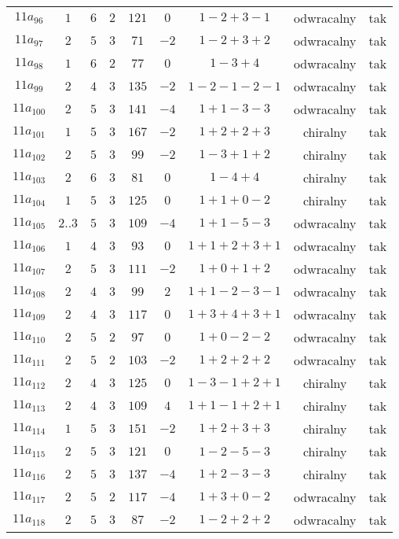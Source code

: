 \begin{longtable}{ccccccccc}
$11a_{96}$ & $1$ & $6$ & $2$ & $121$ & $0$ & $1-2+3-1$ & odwracalny & tak \\
$11a_{97}$ & $2$ & $5$ & $3$ & $71$ & $-2$ & $1-2+3+2$ & odwracalny & tak \\
$11a_{98}$ & $1$ & $6$ & $2$ & $77$ & $0$ & $1-3+4$ & odwracalny & tak \\
$11a_{99}$ & $2$ & $4$ & $3$ & $135$ & $-2$ & $1-2-1-2-1$ & odwracalny & tak \\
$11a_{100}$ & $2$ & $5$ & $3$ & $141$ & $-4$ & $1+1-3-3$ & odwracalny & tak \\
$11a_{101}$ & $1$ & $5$ & $3$ & $167$ & $-2$ & $1+2+2+3$ & chiralny & tak \\
$11a_{102}$ & $2$ & $5$ & $3$ & $99$ & $-2$ & $1-3+1+2$ & chiralny & tak \\
$11a_{103}$ & $2$ & $6$ & $3$ & $81$ & $0$ & $1-4+4$ & chiralny & tak \\
$11a_{104}$ & $1$ & $5$ & $3$ & $125$ & $0$ & $1+1+0-2$ & chiralny & tak \\
$11a_{105}$ & $2..3$ & $5$ & $3$ & $109$ & $-4$ & $1+1-5-3$ & odwracalny & tak \\
$11a_{106}$ & $1$ & $4$ & $3$ & $93$ & $0$ & $1+1+2+3+1$ & odwracalny & tak \\
$11a_{107}$ & $2$ & $5$ & $3$ & $111$ & $-2$ & $1+0+1+2$ & odwracalny & tak \\
$11a_{108}$ & $2$ & $4$ & $3$ & $99$ & $2$ & $1+1-2-3-1$ & odwracalny & tak \\
$11a_{109}$ & $2$ & $4$ & $3$ & $117$ & $0$ & $1+3+4+3+1$ & odwracalny & tak \\
$11a_{110}$ & $2$ & $5$ & $2$ & $97$ & $0$ & $1+0-2-2$ & odwracalny & tak \\
$11a_{111}$ & $2$ & $5$ & $2$ & $103$ & $-2$ & $1+2+2+2$ & odwracalny & tak \\
$11a_{112}$ & $2$ & $4$ & $3$ & $125$ & $0$ & $1-3-1+2+1$ & chiralny & tak \\
$11a_{113}$ & $2$ & $4$ & $3$ & $109$ & $4$ & $1+1-1+2+1$ & chiralny & tak \\
$11a_{114}$ & $1$ & $5$ & $3$ & $151$ & $-2$ & $1+2+3+3$ & chiralny & tak \\
$11a_{115}$ & $2$ & $5$ & $3$ & $121$ & $0$ & $1-2-5-3$ & chiralny & tak \\
$11a_{116}$ & $2$ & $5$ & $3$ & $137$ & $-4$ & $1+2-3-3$ & chiralny & tak \\
$11a_{117}$ & $2$ & $5$ & $2$ & $117$ & $-4$ & $1+3+0-2$ & odwracalny & tak \\
$11a_{118}$ & $2$ & $5$ & $3$ & $87$ & $-2$ & $1-2+2+2$ & odwracalny & tak \\

\end{longtable}
